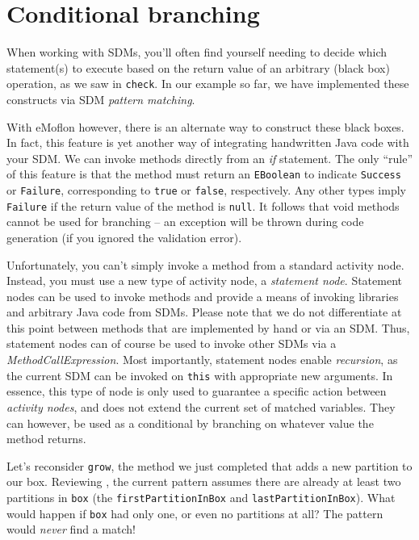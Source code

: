 \newpage
\hypertarget{sec:conBran}{}
\section{Conditional branching}
\genHeader

When working with SDMs, you'll often find yourself needing to decide which statement(s) to execute based on the return value of an arbitrary (black box)
operation, as we saw in \texttt{check}. In our example so far, we have implemented these constructs via SDM \emph{pattern matching}. 

With eMoflon however, there is an alternate way to construct these black boxes.
In fact, this feature is yet another way of integrating handwritten Java code with your SDM. We can invoke methods directly from an \emph{if} statement. The only ``rule'' of this feature is that the method must return an
\texttt{EBoolean} to indicate \texttt{Success} or \texttt{Failure}, corresponding to \texttt{true} or \texttt{false}, respectively. Any other types imply
\texttt{Failure} if the return value of the method is \texttt{null}. It follows that void methods cannot be used for branching -- an exception will be thrown
during code generation (if you ignored the validation error).

Unfortunately, you can't simply invoke a method from a standard activity node. Instead, you must use a new type of activity node, a \emph{statement
node}. Statement nodes can be used to invoke methods and provide a means of invoking libraries and
arbitrary Java code from SDMs. Please note that we do not differentiate at this point between methods that are implemented by hand or via an SDM. Thus,
statement nodes can of course be used to invoke other SDMs via a \emph{MethodCallExpression}. Most importantly, statement nodes enable \emph{recursion}, as the
current SDM can be invoked on \texttt{this} with appropriate new arguments. In essence, this type of node is only used to guarantee a specific action
between \emph{activity nodes}, and does not extend the current set of matched variables. They can however, be used as a conditional by branching on
whatever value the method returns.

Let's reconsider \texttt{grow}, the method we just completed that adds a new partition to our box. Reviewing , the current pattern assumes there are already at least two partitions in \texttt{box} (the
\texttt{firstPartitionInBox} and \texttt{lastPartitionInBox}). What would happen
if \texttt{box} had only one, or even no partitions at all? The pattern would \emph{never} find a match!

